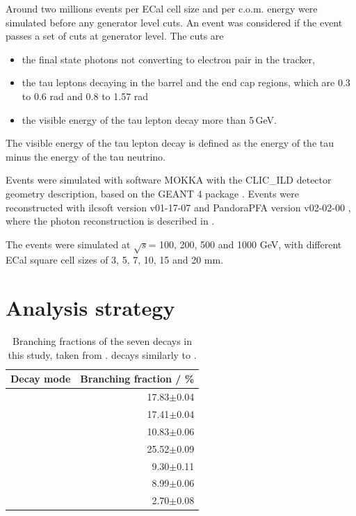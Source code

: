 \documentclass[a4paper,11pt]{article}
\newcommand{\decayElectron}{\Pem\PAGne\PGnGt}
\newcommand{\decayMuon}{\PGmm\PAGnGm\PGnGt}
\newcommand{\decayPion}{\PGpm\PGnGt}
\newcommand{\decayRho}{\PGrP{\PGpm\PGpz}\PGnGt}
\newcommand{\decayAiPhoton}{\PaDoP{\PGpm\PGpz\PGpz}\PGnGt}
\newcommand{\decayAiPion}{\PaDoP{\PGpm\PGpm\PGpp}\PGnGt}
\newcommand{\decayThreePionPhoton}{\PGpm\PGpm\PGpp\PGnGt}
\newcommand{\rootS}{\ensuremath{\sqrt{s}}}
\begin{document}
Around two millions events per ECal cell size and per c.o.m. energy were simulated before any generator level cuts. An event was considered if the event passes a set of cuts at generator level. The cuts are 
\begin{itemize}
  \item the final state photons not converting to electron pair in the tracker,
  \item the tau leptons decaying in the barrel and the end cap regions, which are 0.3 to 0.6 rad and 0.8 to 1.57 rad
  \item the visible energy of the tau lepton decay more than 5\,GeV.
\end{itemize}

The visible energy of the tau lepton decay is defined as the energy of the tau minus the energy of the tau neutrino. 

Events were simulated with software MOKKA \cite{MoradeFreitas:2002kj} with the CLIC\_ILD detector geometry description, based on the GEANT 4 package  \cite{Agostinelli:2002hh}. Events were reconstructed with ilcsoft version v01-17-07 \cite{Gaede:82475} and PandoraPFA version v02-02-00 \cite{Marshall:2015rfa}, where the photon reconstruction is described in \cite{Xu:2016rcz}.

The events were simulated at \rootS = 100, 200, 500 and 1000 GeV, with different ECal square cell sizes of 3, 5, 7, 10, 15 and 20 mm.

\section{Analysis strategy}

\begin{table}[htbp]
\centering
\caption{\label{tab:decay_mode} Branching fractions of the seven \Ptauon decays in this study, taken from \cite{Agashe:2014kda}. \APtauon decays similarly to \Ptauon.}
\smallskip
\begin{tabular}{|l |r|}
\hline
  \textbf{Decay mode} & \textbf{Branching fraction / \%} \\
\hline
  \decayElectron        & 17.83$\pm$0.04   \\
  \decayMuon  	& 17.41$\pm$0.04  \\
  \decayPion     	& 10.83$\pm$0.06   \\
  \decayRho	& 25.52$\pm$0.09 \\
  \decayAiPhoton	& 9.30$\pm$0.11    \\
  \decayAiPion  	    & 8.99$\pm$0.06  \\
  \decayThreePionPhoton  	    & 2.70$\pm$0.08  \\

\hline
\end{tabular}
\end{table}
\end{document}

